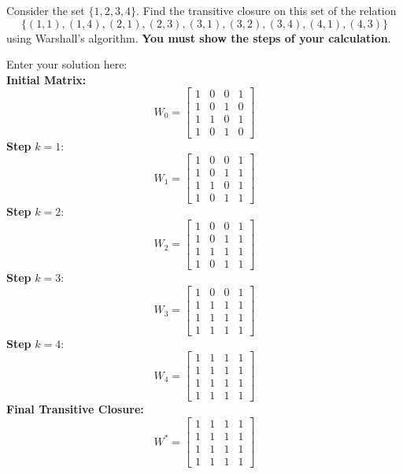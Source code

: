 \documentclass[10pt]{exam}
\begin{document}
\begin{questions}
\question[6] Consider the set $\{1, 2, 3, 4\}$. Find the transitive closure on this set of the relation $$\{(1, 1), (1, 4), (2, 1), (2, 3), (3, 1), (3,2), (3,4), (4,1), (4,3)\}$$ using Warshall's algorithm. \textbf{You must show the steps of your calculation}.

\begin{solution}
    Enter your solution here:\\
    \textbf{Initial Matrix:}
    \[W_0 = \begin{bmatrix}
    1 & 0 & 0 & 1 \\
    1 & 0 & 1 & 0 \\
    1 & 1 & 0 & 1 \\
    1 & 0 & 1 & 0
    \end{bmatrix}\]
    \textbf{Step } $k = 1$:\\
    \[W_1 = \begin{bmatrix}
    1 & 0 & 0 & 1 \\
    1 & 0 & 1 & 1 \\
    1 & 1 & 0 & 1 \\
    1 & 0 & 1 & 1
    \end{bmatrix}\]
    \textbf{Step } $k = 2$:\\
    \[W_2 = \begin{bmatrix}
    1 & 0 & 0 & 1 \\
    1 & 0 & 1 & 1 \\
    1 & 1 & 1 & 1 \\
    1 & 0 & 1 & 1
    \end{bmatrix}\]
    \textbf{Step } $k = 3$:\\
    \[W_3 = \begin{bmatrix}
    1 & 0 & 0 & 1 \\
    1 & 1 & 1 & 1 \\
    1 & 1 & 1 & 1 \\
    1 & 1 & 1 & 1
    \end{bmatrix}\]
    \textbf{Step } $k = 4$:\\
    \[W_4 = \begin{bmatrix}
    1 & 1 & 1 & 1 \\
    1 & 1 & 1 & 1 \\
    1 & 1 & 1 & 1 \\
    1 & 1 & 1 & 1
    \end{bmatrix}\]
    \textbf{Final Transitive Closure:}
    \[W^* = \begin{bmatrix}
    1 & 1 & 1 & 1 \\
    1 & 1 & 1 & 1 \\
    1 & 1 & 1 & 1 \\
    1 & 1 & 1 & 1
    \end{bmatrix}\]
\end{solution}


\end{questions}
\end{document}
